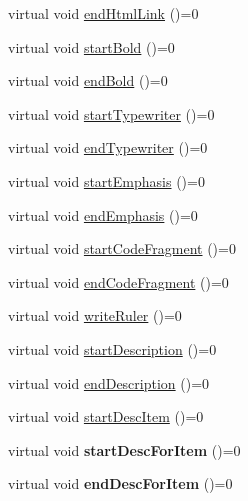\begin{DoxyCompactItemize}
virtual void \mbox{\hyperlink{class_base_output_doc_interface_afb808c1c487135d4fb2156d0675b387e}{end\+Html\+Link}} ()=0
\item 
virtual void \mbox{\hyperlink{class_base_output_doc_interface_aa0bfe5ef08077a7191ba4666f47c441b}{start\+Bold}} ()=0
\item 
virtual void \mbox{\hyperlink{class_base_output_doc_interface_a2a17911ba778f8efac83999fb5d190d9}{end\+Bold}} ()=0
\item 
virtual void \mbox{\hyperlink{class_base_output_doc_interface_abde41a60b900d35b0b198f43731c1cd0}{start\+Typewriter}} ()=0
\item 
virtual void \mbox{\hyperlink{class_base_output_doc_interface_a9e987baf8aed76f0e5e6676b3238d2c8}{end\+Typewriter}} ()=0
\item 
virtual void \mbox{\hyperlink{class_base_output_doc_interface_a21debc3a6c4c58791a41e715dc78f4ab}{start\+Emphasis}} ()=0
\item 
virtual void \mbox{\hyperlink{class_base_output_doc_interface_aed2cf04d82648509f97403bd4ce62590}{end\+Emphasis}} ()=0
\item 
virtual void \mbox{\hyperlink{class_base_output_doc_interface_ab19fc767b08c25b0ca7c976d24799bda}{start\+Code\+Fragment}} ()=0
\item 
virtual void \mbox{\hyperlink{class_base_output_doc_interface_a08f032482a8f23ac1aab66552db43a81}{end\+Code\+Fragment}} ()=0
\item 
virtual void \mbox{\hyperlink{class_base_output_doc_interface_ade0d004fb6e8641c92f2f144d7242f0b}{write\+Ruler}} ()=0
\item 
virtual void \mbox{\hyperlink{class_base_output_doc_interface_ac9c801c3ad0b50e3e69be184b50c2fef}{start\+Description}} ()=0
\item 
virtual void \mbox{\hyperlink{class_base_output_doc_interface_ac25c565e9fd8aee6c2b0d9b71fcff380}{end\+Description}} ()=0
\item 
virtual void \mbox{\hyperlink{class_base_output_doc_interface_a5d1cc59d94c3f529c90e0a06704be181}{start\+Desc\+Item}} ()=0
\item 
\mbox{\label{class_base_output_doc_interface_a4bd0d53fa5bd37ab551b462fa1935cff}} 
virtual void {\bfseries start\+Desc\+For\+Item} ()=0
\item 
\mbox{\label{class_base_output_doc_interface_a1b04c0dc473f245979860c158ea450e7}} 
virtual void {\bfseries end\+Desc\+For\+Item} ()=0

\end{DoxyCompactItemize}
